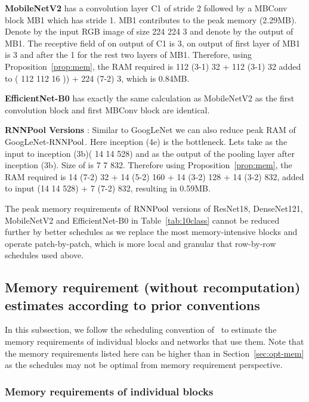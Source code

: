 \documentclass[10pt]{article}
\newcommand{\rpool}{\ensuremath{{\rm RNNPool}}\xspace}
\begin{document}
\textbf{MobileNetV2} has a convolution layer C1 of stride 2 followed
by a MBConv block MB1 which has stride 1. MB1 contributes to the peak
memory (2.29MB). Denote by  the input RGB image of size 224
 224  3 and denote by  the output of MB1. The
receptive field of  on output of C1 is 3, on output of first layer
of MB1 is 3 and after the 1 for the rest two layers of MB1. Therefore,
using Proposition~\ref{prop:mem}, the RAM required is 112 
(3-1)  32 + 112  (3-1)  32 added to  ( 112
 112  16 )) + 224  (7-2)  3, which is
0.84MB.

\textbf{EfficientNet-B0} has exactly the same calculation as
MobileNetV2 as the first convolution block and first MBConv block are
identical.


\textbf{RNNPool Versions} : Similar to GoogLeNet we can also reduce
peak RAM of GoogLeNet-\rpool. Here inception (4e) is the bottleneck.
Lets take  as the input to inception (3b)( 14  14 
528) and  as the output of the pooling layer after inception
(3b). Size of  is 7  7  832. Therefore using
Proposition~\ref{prop:mem}, the RAM required is 14  (7-2)
 32 + 14  (5-2)  160 + 14  (3-2)
 128 + 14  (3-2)  832, added to input (14
 14  528) + 7  (7-2)  832, resulting
in 0.59MB.

The peak memory requirements of \rpool versions of ResNet18,
DenseNet121, MobileNetV2 and EfficientNet-B0 in
Table~\ref{tab:10class} cannot be reduced further by better schedules
as we replace the most memory-intensive blocks and operate
patch-by-patch, which is more local and granular that row-by-row
schedules used above.





\subsection{Memory requirement (without recomputation) estimates according to prior conventions}
\label{sec:compute-opt}




In this subsection, we follow the scheduling convention
of~\citet{chowdhery2019visual} to estimate the memory requirements of
individual blocks and networks that use them. Note that the memory
requirements listed here can be higher than in
Section~\ref{sec:opt-mem} as the schedules may not be optimal from
memory requirement perspective.


\subsubsection{Memory requirements of individual blocks}
\end{document}
